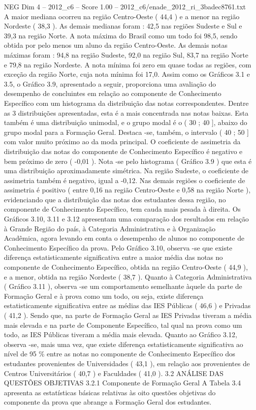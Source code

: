 \begin{textsample}{NEG Dim 4 – 2012\_c6 – Score 1.00 – 2012\_c6/enade\_2012\_ri\_3badec8761.txt}
A maior mediana ocorreu na região Centro-Oeste ( 44,4 ) e a menor na região Nordeste ( 38,3 ).
As demais medianas foram : 42,5 nas regiões Sudeste e Sul e 39,3 na região Norte.
A nota máxima do Brasil como um todo foi 98,5, sendo obtida por pelo menos um aluno da região Centro-Oeste.
As demais notas máximas foram : 94,8 na região Sudeste, 92,0 na região Sul, 83,7 na região Norte e 79,8 na região Nordeste.
A nota mínima foi zero em quase todas as regiões, com exceção da região Norte, cuja nota mínima foi 17,0.
Assim como os Gráficos 3.1 e 3.5, o Gráfico 3.9, apresentado a seguir, proporciona uma avaliação do desempenho de concluintes em relação ao componente de Conhecimento Específico com um histograma da distribuição das notas correspondentes.
Dentre as 3 distribuições apresentadas, esta é a mais concentrada nas notas baixas.
Esta também é uma distribuição unimodal, e o grupo modal é o ( 30 ; 40 ], abaixo do grupo modal para a Formação Geral.
Destaca -se, também, o intervalo ( 40 ; 50 ] com valor muito próximo ao da moda principal.
O coeficiente de assimetria da distribuição das notas do componente de Conhecimento Específico é negativo e bem próximo de zero ( -0,01 ).
Nota -se pelo histograma ( Gráfico 3.9 ) que esta é uma distribuição aproximadamente simétrica.
Na região Sudeste, o coeficiente de assimetria também é negativo, igual a -0,12.
Nas demais regiões o coeficiente de assimetria é positivo ( entre 0,16 na região Centro-Oeste e 0,58 na região Norte ), evidenciando que a distribuição das notas dos estudantes dessa região, no componente de Conhecimento Específico, tem cauda mais pesada à direita.
Os Gráficos 3.10, 3.11 e 3.12 apresentam uma comparação dos resultados em relação à Grande Região do país, à Categoria Administrativa e à Organização Acadêmica, agora levando em conta o desempenho de alunos no componente de Conhecimento Específico da prova.
Pelo Gráfico 3.10, observa -se que existe diferença estatisticamente significativa entre a maior média das notas no componente de Conhecimento Específico, obtida na região Centro-Oeste ( 44,9 ), e a menor, obtida na região Nordeste ( 38,7 ).
Quanto à Categoria Administrativa ( Gráfico 3.11 ), observa -se um comportamento semelhante àquele da parte de Formação Geral e à prova como um todo, ou seja, existe diferença estatisticamente significativa entre as médias das IES Públicas ( 46,6 ) e Privadas ( 41,2 ).
Sendo que, na parte de Formação Geral as IES Privadas tiveram a média mais elevada e na parte de Componente Específico, tal qual na prova como um todo, as IES Públicas tiveram a média mais elevada.
Quanto ao Gráfico 3.12, observa -se, mais uma vez, que existe diferença estatisticamente significativa ao nível de 95 \% entre as notas no componente de Conhecimento Específico dos estudantes provenientes de Universidades ( 43,1 ), em relação aos provenientes de Centros Universitários ( 40,7 ) e Faculdades ( 41,0 ). 3.2 ANÁLISE DAS QUESTÕES OBJETIVAS 3.2.1 Componente de Formação Geral A Tabela 3.4 apresenta as estatísticas básicas relativas às oito questões objetivas do componente da prova que abrange a Formação Geral dos estudantes.

\end{textsample}
